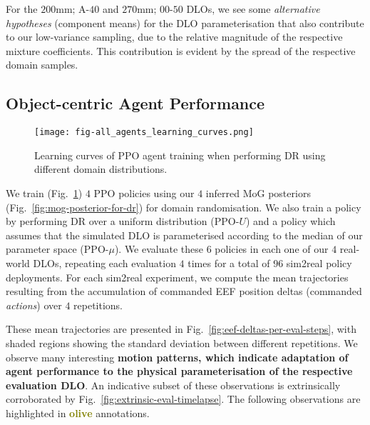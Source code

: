 For the $\text{200mm; A-40}$ and $\text{270mm; 00-50}$ DLOs, we see some \emph{alternative hypotheses} (component means) for the DLO parameterisation that also contribute to our low-variance sampling, due to the relative magnitude of the respective mixture coefficients. This contribution is evident by the spread of the respective domain samples.

\subsection{Object-centric Agent Performance}
\label{subsec:policy-learn-sim2real-res}

\begin{figure}[t]
    \centering
    \texttt{[image: fig-all\_agents\_learning\_curves.png]}
    \caption{Learning curves of PPO agent training when performing DR using different domain distributions.}
    \label{fig:rew-per-train-iter}
\end{figure}

We train (Fig.~\ref{fig:rew-per-train-iter}) $4$ PPO policies using our $4$ inferred MoG posteriors (Fig.~\ref{fig:mog-posterior-for-dr}) for domain randomisation. We also train a policy by performing DR over a uniform distribution ($\text{PPO-}\mathit{U}$) and a policy which assumes that the simulated DLO is parameterised according to the median of our parameter space ($\text{PPO-}\mu$). We evaluate these $6$ policies in each one of our $4$ real-world DLOs, repeating each evaluation $4$ times for a total of $96$ sim2real policy deployments. For each sim2real experiment, we compute the mean trajectories resulting from the accumulation of commanded EEF position deltas (commanded \emph{actions}) over $4$ repetitions.

These mean trajectories are presented in Fig.~\ref{fig:eef-deltas-per-eval-steps}, with shaded regions showing the standard deviation between different repetitions. We observe many interesting \textbf{motion patterns, which indicate adaptation of agent performance to the physical parameterisation of the respective evaluation DLO}. An indicative subset of these observations is extrinsically corroborated by Fig.~\ref{fig:extrinsic-eval-timelapse}. The following observations are highlighted in \textcolor{olive}{\textbf{olive}} annotations.

